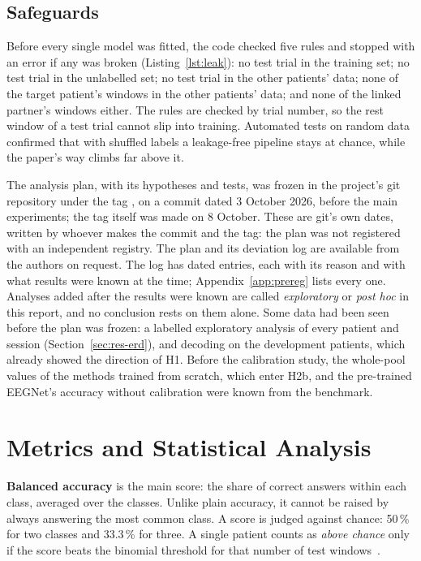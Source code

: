 \subsection{Safeguards}
Before every single model was fitted, the code checked five rules and stopped with an
error if any was broken (Listing~\ref{lst:leak}): no test trial in the training set; no
test trial in the unlabelled set; no test trial in the other patients' data; none of the
target patient's windows in the other patients' data; and none of the linked partner's
windows either. The rules are checked by trial number, so the rest window of a test trial
cannot slip into training. Automated tests on random data confirmed that with shuffled
labels a leakage-free pipeline stays at chance, while the paper's way climbs far above it.



The analysis plan, with its hypotheses and tests, was frozen in the project's git
repository under the tag , on a commit dated 3 October 2026, before the
main experiments; the tag itself was made on 8 October. These are git's own dates, written
by whoever makes the commit and the tag: the plan was not registered with an independent
registry. The plan and its deviation log are available from the authors on request. The
log has \nDeviations{} dated entries, each with its reason and with what results were
known at the time; Appendix~\ref{app:prereg} lists every one. Analyses added after the
results were known are called \emph{exploratory} or \emph{post hoc} in this report, and no
conclusion rests on them alone. Some data had been seen before the plan was frozen: a
labelled exploratory analysis of every patient and session (Section~\ref{sec:res-erd}),
and decoding on the development patients, which already showed the direction of H1.
Before the calibration study, the whole-pool values of the methods trained from scratch,
which enter H2b, and the pre-trained EEGNet's accuracy without calibration were known
from the benchmark.

\section{Metrics and Statistical Analysis}\label{sec:stats}

\textbf{Balanced accuracy} is the main score: the share of correct answers within each
class, averaged over the classes. Unlike plain accuracy, it cannot be raised by always
answering the most common class. A score is judged against chance: 50\,\% for two
classes and 33.3\,\% for three. A single patient counts as \emph{above chance} only if
the score beats the binomial threshold for that number of test windows~\cite{combrisson2015}.

